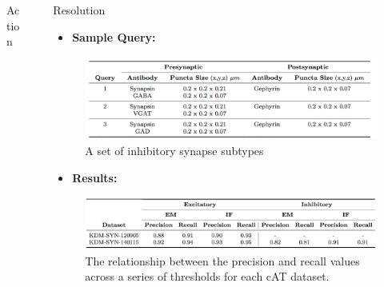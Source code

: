 \documentclass[final, table]{beamer}
\newlength{\sepwid}
\newlength{\onecolwid}
\newlength{\twocolwid}
\begin{document}
\begin{frame}[t]
\begin{columns}[t]
\begin{column}{\twocolwid}
\begin{block}{Action}
\begin{columns}[t]
\begin{column}{\onecolwid}
\end{column}
\end{columns} 
\end{block}
\end{column} 

\begin{column}{\sepwid}\end{column}  %
\begin{column}{\onecolwid}



\begin{block}{Resolution} 

\begin{itemize} 
\item \textbf{Sample Query: } 
\end{itemize} 

\begin{figure}[!h]
\centering
\includegraphics[width=1\textwidth]{figs/sample_query}
\caption{A set of inhibitory synapse subtypes}
\end{figure}

\begin{itemize} 
\item \textbf{Results:} 
\end{itemize} 

\begin{figure}[!h]
\centering
\includegraphics[width=1\textwidth]{figs/table1}
\caption{The relationship between the precision and recall values across a series of thresholds for each cAT dataset.}
\label{fig:pr_curves}
\end{figure}



\end{block}
\end{column}
\end{columns}
\end{frame}
\end{document}
